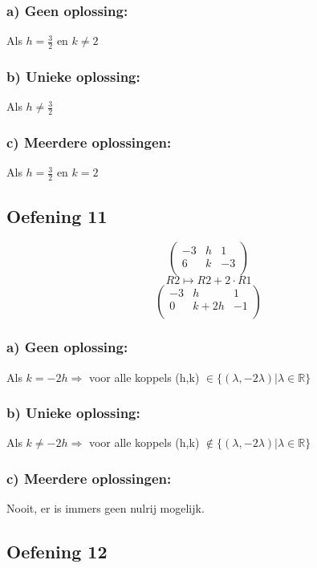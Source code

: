 \documentclass[lineaire_algebra_oplossingen.tex]{subfiles}
\begin{document}
\subsubsection*{a) Geen oplossing:}
Als $h = \frac{3}{2}$ en $k \neq 2$
\subsubsection*{b) Unieke oplossing:}
Als $h \neq \frac{3}{2}$
\subsubsection*{c) Meerdere oplossingen:}
Als $h = \frac{3}{2}$ en $k = 2$
\subsection{Oefening 11}
\[
\begin{pmatrix}
-3 &  h &  1\\
6 &  k &  -3\\
\end{pmatrix}
\]
\[R2 \longmapsto R2 + 2\cdot R1\]
\[
\begin{pmatrix}
-3 &  h &  1\\
0 &  k+2h &  -1\\
\end{pmatrix}
\]
\subsubsection*{a) Geen oplossing:}
Als $k = -2h \Rightarrow$ voor alle koppels (h,k) $\in \{(\lambda, -2\lambda)| \lambda \in \mathbb{R}\}$
\subsubsection*{b) Unieke oplossing:}
Als $k \neq -2h \Rightarrow$ voor alle koppels (h,k) $\not \in \{(\lambda, -2\lambda)| \lambda \in \mathbb{R}\}$
\subsubsection*{c) Meerdere oplossingen:}
Nooit, er is immers geen nulrij mogelijk.

\subsection{Oefening 12}
\end{document}
